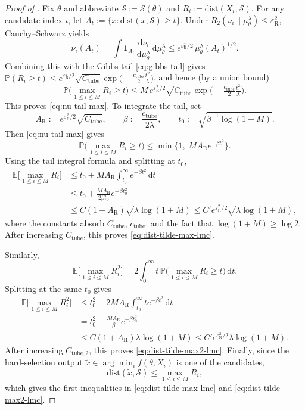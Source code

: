 \documentclass{article}
\def\d{\delta}
\theoremstyle{normaltheorem}
\newcommand{\gibbs}{\mu}
\newcommand{\ud}{\mathrm{d}}
\newcommand{\calS}{\mathcal{S}}
\renewcommand{\d}{\mathrm{d}}
\begin{document}
\begin{proof}[Proof of ]
	Fix $\theta$ and abbreviate \(\mathcal{S}:=\calS(\theta)\) and
	\(R_i:=\mathrm{dist}(X_i,\mathcal{S})\). For any candidate index $i$, let
	\(A_t:=\{x:\mathrm{dist}(x,\mathcal{S})\ge t\}\).
	Under $R_2(\nu_i\|\gibbs_\theta^\lambda)\le \varepsilon_{\mathrm{R}}^2$, Cauchy--Schwarz yields
	\[
	\nu_i(A_t)
	=\int \mathbf 1_{A_t}\,\frac{\d \nu_i}{\d \gibbs_\theta^\lambda}\,\d \gibbs_\theta^\lambda
	\le e^{\varepsilon_{\mathrm{R}}^2/2}\,\gibbs_\theta^\lambda(A_t)^{1/2}.
	\]
		Combining this with the Gibbs tail \eqref{eq:gibbs-tail} gives
		$\mathbb P(R_i\ge t)\le e^{\varepsilon_{\mathrm{R}}^2/2}\sqrt{C_{\mathrm{tube}}}\exp\!\big(-\tfrac{c_{\mathrm{tube}}}{2}\tfrac{t^2}{\lambda}\big)$,
		and hence (by a union bound)
		\[
		\mathbb P\!\Big(\max_{1\le i\le M} R_i\ge t\Big)
		\le
		M\,e^{\varepsilon_{\mathrm{R}}^2/2}\sqrt{C_{\mathrm{tube}}}\exp\!\Big(-\tfrac{c_{\mathrm{tube}}}{2}\tfrac{t^2}{\lambda}\Big).
		\]
		This proves \eqref{eq:nu-tail-max}. To integrate the tail, set
		\[
		A_{\mathrm R}:=e^{\varepsilon_{\mathrm{R}}^2/2}\sqrt{C_{\mathrm{tube}}},
		\qquad
		\beta:=\frac{c_{\mathrm{tube}}}{2\lambda},
		\qquad
		t_0:=\sqrt{\beta^{-1}\log(1+M)}.
		\]
		Then \eqref{eq:nu-tail-max} gives
		\[
		\mathbb P\!\Big(\max_{1\le i\le M}R_i\ge t\Big)
		\le \min\{1,\;M A_{\mathrm R}e^{-\beta t^2}\}.
		\]
		Using the tail integral formula and splitting at \(t_0\),
		\begin{align*}
		\mathbb E\Big[\max_{1\le i\le M} R_i\Big]
		&\le t_0+M A_{\mathrm R}\int_{t_0}^{\infty}e^{-\beta t^2}\,\ud t\\
		&\le t_0+\frac{M A_{\mathrm R}}{2\beta t_0}e^{-\beta t_0^2}\\
		&\le C(1+A_{\mathrm R})\sqrt{\lambda\log(1+M)}
		\le C' e^{\varepsilon_{\mathrm{R}}^2/2}\sqrt{\lambda\log(1+M)},
		\end{align*}
		where the constants absorb \(C_{\mathrm{tube}}\), \(c_{\mathrm{tube}}\), and the fact that \(\log(1+M)\ge\log 2\).
		After increasing \(C_{\mathrm{tube}}\), this proves \eqref{eq:dist-tilde-max-lmc}.
		
		Similarly,
		\[
		\mathbb E\Big[\max_{1\le i\le M} R_i^2\Big]
		=
		2\int_0^\infty t\,\mathbb P\!\Big(\max_{1\le i\le M} R_i\ge t\Big)\,\ud t.
		\]
		Splitting at the same \(t_0\) gives
		\begin{align*}
		\mathbb E\Big[\max_{1\le i\le M} R_i^2\Big]
		&\le t_0^2+2M A_{\mathrm R}\int_{t_0}^{\infty}t e^{-\beta t^2}\,\ud t\\
		&=t_0^2+\frac{M A_{\mathrm R}}{\beta}e^{-\beta t_0^2}\\
		&\le C(1+A_{\mathrm R})\lambda\log(1+M)
		\le C' e^{\varepsilon_{\mathrm{R}}^2/2}\lambda\log(1+M).
		\end{align*}
		After increasing \(C_{\mathrm{tube},2}\), this proves \eqref{eq:dist-tilde-max2-lmc}.
	Finally, since the hard-selection output \(\tilde x\in\arg\min_i f(\theta,X_i)\) is one of the candidates,
	\[
	\mathrm{dist}(\tilde x,\mathcal{S})
	\le \max_{1\le i\le M}R_i,
	\]
	which gives the first inequalities in \eqref{eq:dist-tilde-max-lmc} and \eqref{eq:dist-tilde-max2-lmc}.
\end{proof}
\end{document}
